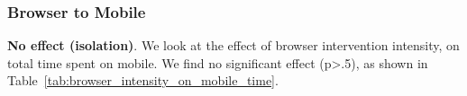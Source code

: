 
\subsubsection{Browser to Mobile}

\textbf{No effect (isolation)}. We look at the effect of browser intervention intensity, on total time spent on mobile. We find no significant effect (p>.5), as shown in Table~\ref{tab:browser_intensity_on_mobile_time}. %

